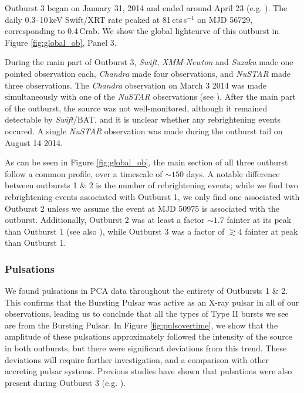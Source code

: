\par Outburst 3 began on January 31, 2014 \citep{Negoro_OB3,Kennea_BPOutburst} and ended around April 23 (e.g. \citealp{Dai_OB3}).  The daily 0.3--10\,keV Swift/XRT rate peaked at 81\,cts\,s$^{-1}$ on MJD 56729, corresponding to 0.4\,Crab.  We show the global lightcurve of this outburst in Figure \ref{fig:global_ob}, Panel 3.
\par During the main part of Outburst 3, \textit{Swift}, \textit{XMM-Newton} and \textit{Suzaku} made one pointed observation each, \textit{Chandra} made four observations, and \textit{NuSTAR} made three observations.  The \textit{Chandra} observation on March 3 2014 was made simultaneously with one of the \textit{NuSTAR} observations (see \citealp{Younes_Expo}).  After the main part of the outburst, the source was not well-monitored, although it remained detectable by \textit{Swift}/BAT, and it is unclear whether any rebrightening events occured.  A single \textit{NuSTAR} observation was made during the outburst tail on August 14 2014.

\par As can be seen in Figure \ref{fig:global_ob}, the main section of all three outburst follow a common profile, over a timescale of $\sim150$ days.  A notable difference between outbursts 1 \& 2 is the number of rebrightening events; while we find two rebrightening events associated with Outburst 1, we only find one associated with Outburst 2 unless we assume the event at MJD 50975 is associated with the outburst.  Additionally, Outburst 2 was at least a factor $\sim1.7$ fainter at its peak than Outburst 1 (see also \citealp{Woods_OB2}), while Outburst 3 was a factor of $\gtrsim4$ fainter at peak than Outburst 1.

\subsubsection{Pulsations}

\par We found pulsations in PCA data throughout the entirety of Outbursts 1 \& 2.  This confirms that the Bursting Pulsar was active as an X-ray pulsar in all of our observations, leading us to conclude that all the types of Type II bursts we see are from the Bursting Pulsar.  In Figure \ref{fig:pulsovertime}, we show that the amplitude of these pulsations approximately followed the intensity of the source in both outbursts, but there were significant deviations from this trend.  These deviations will require further investigation, and a comparison with other accreting pulsar systems.  Previous studies have shown that pulsations were also present during Outburst 3 (e.g. \citealp{Sanna_BP}).

